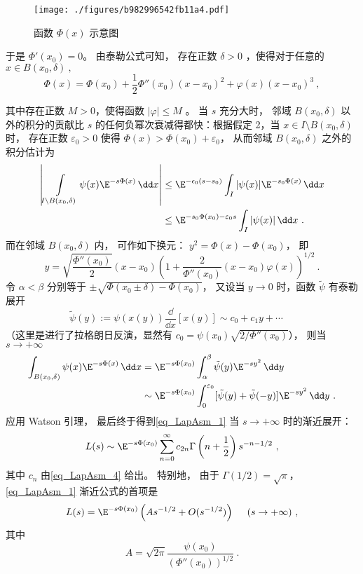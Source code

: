 \begin{figure}[ht]
  \centering
  \texttt{[image: ./figures/b982996542fb11a4.pdf]}
  \caption{函数 $\Phi(x)$ 示意图} \label{fig_LapAsm_1}
\end{figure}

于是 $\Phi'(x_0)=0$。 由泰勒公式可知， 存在正数 $\delta>0$ ，使得对于任意的 $x\in B(x_0,\delta)~,$  
\[
  \Phi(x)=\Phi(x_0)+\frac{1}{2}\Phi''(x_0)(x-x_0)^2+\varphi(x)(x-x_0)^3~,
\]

其中存在正数 $M>0$，使得函数 $|\varphi|\leq M$ 。 当 $s$ 充分大时， 邻域 $B(x_0,\delta)$ 以外的积分的贡献比 $s$ 的任何负幂次衰减得都快：根据假定 2，当 $x\in I\setminus B(x_0,\delta)$ 时， 存在正数 $\varepsilon_0>0$ 使得 $\Phi(x)>\Phi(x_0)+\varepsilon_0$， 从而邻域 $B(x_0,\delta)$ 之外的积分估计为
\begin{align*}
    \left|\int\limits_{I\setminus B(x_0,\delta)}\psi(x)\E^{-s\Phi(x)}\,\dd x\right|
    &\leq \E^{-\epsilon_0(s-s_0)}\int_I|\psi(x)|\E^{-s_0\Phi(x)}\,\dd x\nonumber\\
    &\leq \E^{-s_0\Phi(x_0)-\varepsilon_0s}\int_{I}|\psi(x)|\,\dd x\nonumber~.
\end{align*}
而在邻域 $B(x_0,\delta)$ 内， 可作如下换元： $y^2=\Phi(x)-\Phi(x_0)$， 即
\[
  y=\sqrt{\frac{\Phi''(x_0)}{2}}(x-x_0)\left(1+\frac{2}{\Phi''(x_0)}(x-x_0)\varphi(x)\right)^{1/2}~.
\]
令 $\alpha<\beta$ 分别等于 $\pm\sqrt{\Phi(x_0\pm\delta)-\Phi(x_0)}$， 又设当 $y\to0$ 时，函数 $\tilde{\psi}$ 有泰勒展开
\begin{equation}\label{eq_LapAsm_4}
  \tilde{\psi}(y):=\psi(x(y))\frac{\dd}{\dd x}[x(y)]\sim c_0+c_1y+\cdots \quad ~
  \end{equation}
  （这里是进行了拉格朗日反演，显然有 $c_0=\psi(x_0)\sqrt{2/\Phi''(x_0)}$）， 则当 $s\to+\infty$
  $$
  \begin{aligned}
  \int_{B(x_0,\delta)}\psi(x)\E^{-s\Phi(x)}\,\dd x
  &=\E^{-s\Phi(x_0)}\int_{\alpha}^{\beta}\tilde \psi(y)\E^{-sy^2}\,\dd y\\
  &\sim\E^{-s\Phi(x_0)}\int_{0}^{\varepsilon_0}[\tilde \psi(y)+\tilde \psi(-y)]\E^{-sy^2}\,\dd y~.
\end{aligned}
$$
应用 Watson 引理， 最后终于得到\autoref{eq_LapAsm_1} 当 $s\to+\infty$ 时的渐近展开：
\begin{equation}\label{eq_LapAsm_5}
  L(s)\sim \E^{-s\Phi(x_0)}\sum_{n=0}^\infty c_{2n}\Gamma\left(n+\frac{1}{2}\right)s^{-n-1/2}~,
\end{equation}
其中 $c_n$ 由\autoref{eq_LapAsm_4} 给出。 特别地， 由于 $\Gamma(1/2)=\sqrt{\pi}$， \autoref{eq_LapAsm_1} 渐近公式的首项是
\[
  L(s)=\E^{-s\Phi(x_0)}\left(As^{-1/2}+O(s^{-1/2})\right)~\quad (s\to+\infty)~,
\]
其中
\[
  A=\sqrt{2\pi}\frac{\psi(x_0)}{(\Phi''(x_0))^{1/2}}~.
\]

